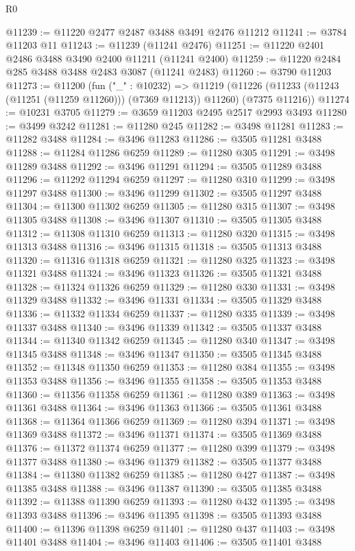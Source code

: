 \begin{lexlean}{R0}
\begin{coremodule}
@11239 := @11220 @2477 @2487 @3488 @3491 @2476 @11212
@11241 := @3784 @11203 @11
@11243 := @11239 (@11241 @2476)
@11251 := @11220 @2401 @2486 @3488 @3490 @2400 @11211 (@11241 @2400)
@11259 := @11220 @2484 @285 @3488 @3488 @2483 @3087 (@11241 @2483)
@11260 := @3790 @11203
@11273 := @11200
    (fun ("_" : @10232) =>
    @11219 (@11226 (@11233 (@11243 (@11251 (@11259 @11260))) (@7369 @11213)) @11260) (@7375 @11216))
@11274 := @10231 @3705
@11279 := @3659 @11203 @2495 @2517 @2993 @3493
@11280 := @3499 @3242
@11281 := @11280 @245
@11282 := @3498 @11281
@11283 := @11282 @3488
@11284 := @3496 @11283
@11286 := @3505 @11281 @3488
@11288 := @11284 @11286 @6259
@11289 := @11280 @305
@11291 := @3498 @11289 @3488
@11292 := @3496 @11291
@11294 := @3505 @11289 @3488
@11296 := @11292 @11294 @6259
@11297 := @11280 @310
@11299 := @3498 @11297 @3488
@11300 := @3496 @11299
@11302 := @3505 @11297 @3488
@11304 := @11300 @11302 @6259
@11305 := @11280 @315
@11307 := @3498 @11305 @3488
@11308 := @3496 @11307
@11310 := @3505 @11305 @3488
@11312 := @11308 @11310 @6259
@11313 := @11280 @320
@11315 := @3498 @11313 @3488
@11316 := @3496 @11315
@11318 := @3505 @11313 @3488
@11320 := @11316 @11318 @6259
@11321 := @11280 @325
@11323 := @3498 @11321 @3488
@11324 := @3496 @11323
@11326 := @3505 @11321 @3488
@11328 := @11324 @11326 @6259
@11329 := @11280 @330
@11331 := @3498 @11329 @3488
@11332 := @3496 @11331
@11334 := @3505 @11329 @3488
@11336 := @11332 @11334 @6259
@11337 := @11280 @335
@11339 := @3498 @11337 @3488
@11340 := @3496 @11339
@11342 := @3505 @11337 @3488
@11344 := @11340 @11342 @6259
@11345 := @11280 @340
@11347 := @3498 @11345 @3488
@11348 := @3496 @11347
@11350 := @3505 @11345 @3488
@11352 := @11348 @11350 @6259
@11353 := @11280 @384
@11355 := @3498 @11353 @3488
@11356 := @3496 @11355
@11358 := @3505 @11353 @3488
@11360 := @11356 @11358 @6259
@11361 := @11280 @389
@11363 := @3498 @11361 @3488
@11364 := @3496 @11363
@11366 := @3505 @11361 @3488
@11368 := @11364 @11366 @6259
@11369 := @11280 @394
@11371 := @3498 @11369 @3488
@11372 := @3496 @11371
@11374 := @3505 @11369 @3488
@11376 := @11372 @11374 @6259
@11377 := @11280 @399
@11379 := @3498 @11377 @3488
@11380 := @3496 @11379
@11382 := @3505 @11377 @3488
@11384 := @11380 @11382 @6259
@11385 := @11280 @427
@11387 := @3498 @11385 @3488
@11388 := @3496 @11387
@11390 := @3505 @11385 @3488
@11392 := @11388 @11390 @6259
@11393 := @11280 @432
@11395 := @3498 @11393 @3488
@11396 := @3496 @11395
@11398 := @3505 @11393 @3488
@11400 := @11396 @11398 @6259
@11401 := @11280 @437
@11403 := @3498 @11401 @3488
@11404 := @3496 @11403
@11406 := @3505 @11401 @3488

\end{coremodule}
\end{lexlean}
